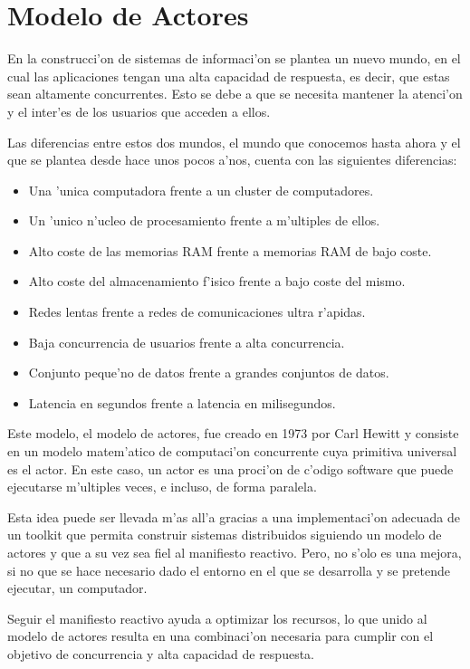 \documentclass[12pt]{article}
\begin{document}
\section{Modelo de Actores}
\label{sec:modelos de actores}
En la construcci'on de sistemas de informaci'on se plantea un nuevo mundo, en el cual
las aplicaciones tengan una alta capacidad de respuesta, es decir, que estas sean altamente concurrentes.
Esto se debe a que se necesita mantener la atenci'on y el inter'es de los usuarios que acceden a ellos.

Las diferencias entre estos dos mundos, el mundo que conocemos hasta ahora y el que se plantea
desde hace unos pocos a'nos, cuenta con las siguientes diferencias:

\begin{itemize}
	\item Una 'unica computadora frente a un cluster de computadores.
	\item Un 'unico n'ucleo de procesamiento frente a m'ultiples de ellos.
	\item Alto coste de las memorias RAM frente a memorias RAM de bajo coste.
	\item Alto coste del almacenamiento f'isico frente a bajo coste del mismo.
    \item Redes lentas frente a redes de comunicaciones ultra r'apidas.
    \item Baja concurrencia de usuarios frente a alta concurrencia.
    \item Conjunto peque'no de datos frente a grandes conjuntos de datos.
    \item Latencia en segundos frente a latencia en milisegundos.
\end{itemize}

Este modelo, el modelo de actores, fue creado en 1973 por Carl Hewitt y consiste en un modelo
matem'atico de computaci'on concurrente cuya primitiva universal es el actor. En este caso, un actor es
una proci'on de c'odigo software que puede ejecutarse m'ultiples veces, e incluso,
de forma paralela.

Esta idea puede ser llevada m'as all'a gracias a una implementaci'on adecuada de un toolkit
que permita construir sistemas distribuidos siguiendo un modelo de actores y que a su vez
sea fiel al manifiesto reactivo. Pero, no s'olo es una mejora, si no que se hace necesario dado
el entorno en el que se desarrolla y se pretende ejecutar, un computador.

Seguir el manifiesto reactivo ayuda a optimizar los recursos, lo que unido al modelo de actores
resulta en una combinaci'on necesaria para cumplir con el objetivo de concurrencia y alta capacidad
de respuesta.
\end{document}
